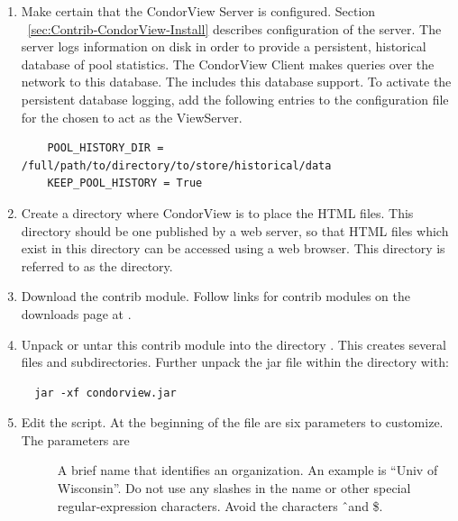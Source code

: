\begin{enumerate}

\item Make certain that the CondorView Server is configured.
Section ~\ref{sec:Contrib-CondorView-Install}
describes configuration of the server.
The server logs information on disk in order to provide a persistent,
historical database of pool statistics.
The CondorView Client makes queries over the network to this
database.
The  includes this database support.
To activate the persistent database logging, add the following entries to
the configuration file for the  chosen to act as the ViewServer.
\begin{verbatim}
    POOL_HISTORY_DIR = /full/path/to/directory/to/store/historical/data 
    KEEP_POOL_HISTORY = True 
\end{verbatim}

\item Create a directory where CondorView is to place the HTML files.  
This directory should be one published by a web server, so that HTML
files which exist in this directory can be accessed using a web browser.  
This directory is referred to as the  directory.

\item Download the  contrib module.
Follow links for contrib modules on the downloads page at
.

\item Unpack or untar this contrib module into the
directory .
This creates several files and subdirectories.
Further unpack the jar file within the  directory with:
\begin{verbatim} 
  jar -xf condorview.jar
\end{verbatim}

\item Edit the  script.  At the beginning of the file
are six parameters to customize.
The parameters are

        \begin{description}

	\item[] A brief name that identifies an
	organization. An example is ``Univ of Wisconsin''.  Do not
	use any slashes in the name or other special regular-expression
	characters. Avoid the characters \Bs \^\  and \$.


\end{description}
\end{enumerate}
